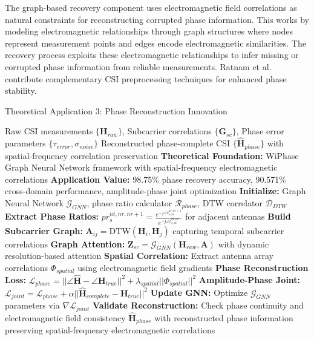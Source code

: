 \documentclass[journal]{IEEEtran}
\begin{document}
The graph-based recovery component uses electromagnetic field correlations as natural constraints for reconstructing corrupted phase information. This works by modeling electromagnetic relationships through graph structures where nodes represent measurement points and edges encode electromagnetic similarities. The recovery process exploits these electromagnetic relationships to infer missing or corrupted phase information from reliable measurements. Ratnam et al. \cite{ratnam2024optimal} contribute complementary CSI preprocessing techniques for enhanced phase stability.

\begin{algorithm}[h]
\caption{Theoretical Application 3: Phase Reconstruction Innovation}
\label{alg:phase_reconstruction}
\begin{algorithmic}[1]
\REQUIRE Raw CSI measurements $\{\mathbf{H}_{raw}\}$, Subcarrier correlations $\{\mathbf{G}_{sc}\}$, Phase error parameters $\{\tau_{error}, \sigma_{noise}\}$
\ENSURE Reconstructed phase-complete CSI $\{\hat{\mathbf{H}}_{phase}\}$ with spatial-frequency correlation preservation
\STATE \textbf{Theoretical Foundation:} WiPhase Graph Neural Network framework \cite{chen2024wiphase} with spatial-frequency electromagnetic correlations
\STATE \textbf{Application Value:} 98.75\% phase recovery accuracy, 90.571\% cross-domain performance, amplitude-phase joint optimization
\STATE \textbf{Initialize:} Graph Neural Network $\mathcal{G}_{GNN}$, phase ratio calculator $\mathcal{R}_{phase}$, DTW correlator $\mathcal{D}_{DTW}$
\STATE \textbf{Extract Phase Ratios:} $pr_s^{nt,nr,nr+1} = \frac{e^{-j\angle c_{s,m}^{nt,nr+1}}}{e^{-j\angle c_{s,m}^{nt,nr}}}$ for adjacent antennas
\STATE \textbf{Build Subcarrier Graph:} $\mathbf{A}_{ij} = \text{DTW}(\mathbf{H}_{i}, \mathbf{H}_{j})$ capturing temporal subcarrier correlations
\STATE \textbf{Graph Attention:} $\mathbf{Z}_{sc} = \mathcal{G}_{GNN}(\mathbf{H}_{raw}, \mathbf{A})$ with dynamic resolution-based attention
\STATE \textbf{Spatial Correlation:} Extract antenna array correlations $\Phi_{spatial}$ using electromagnetic field gradients
\STATE \textbf{Phase Reconstruction Loss:} $\mathcal{L}_{phase} = ||\angle\hat{\mathbf{H}} - \angle\mathbf{H}_{true}||^2 + \lambda_{spatial}||\Phi_{spatial}||^2$
\STATE \textbf{Amplitude-Phase Joint:} $\mathcal{L}_{joint} = \mathcal{L}_{phase} + \alpha||\hat{\mathbf{H}}_{complete} - \mathbf{H}_{true}||^2$
\STATE \textbf{Update GNN:} Optimize $\mathcal{G}_{GNN}$ parameters via $\nabla \mathcal{L}_{joint}$
\STATE \textbf{Validate Reconstruction:} Check phase continuity and electromagnetic field consistency
\RETURN $\hat{\mathbf{H}}_{phase}$ with reconstructed phase information preserving spatial-frequency electromagnetic correlations
\end{algorithmic}
\end{algorithm}
\end{document}
